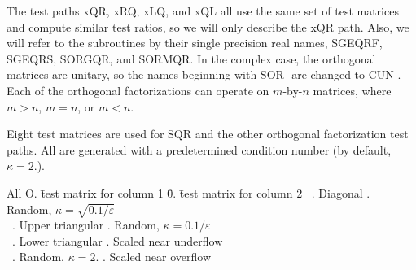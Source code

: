 The test paths xQR, xRQ, xLQ, and xQL all use the same set of test
matrices and compute similar test ratios, so we will only describe
the xQR path.  Also, we will refer to the subroutines by their single
precision real names, SGEQRF, SGEQRS, SORGQR, and SORMQR.
In the complex case, the orthogonal matrices are unitary, so the
names beginning with SOR- are changed to CUN-. 
Each of the orthogonal factorizations can operate on $m$-by-$n$
matrices, where $m > n$, $m = n$, or $m < n$.

Eight test matrices are used for SQR and the other orthogonal
factorization test paths.  All are generated with a predetermined
condition number (by default, $\kappa = 2.$).
\begin{tabbing}
All \= O. \= test matrix for column 1 \= 0. \= test matrix for column 2 \kill
\, . \> Diagonal . \> Random, $\kappa = \sqrt{0.1/\varepsilon}$ \\
\, . \> Upper triangular . \> Random, $\kappa = 0.1 / \varepsilon$ \\
\, . \> Lower triangular . \> Scaled near underflow \\
\, . \> Random, $\kappa = 2.$ . \> Scaled near overflow
\end{tabbing}

